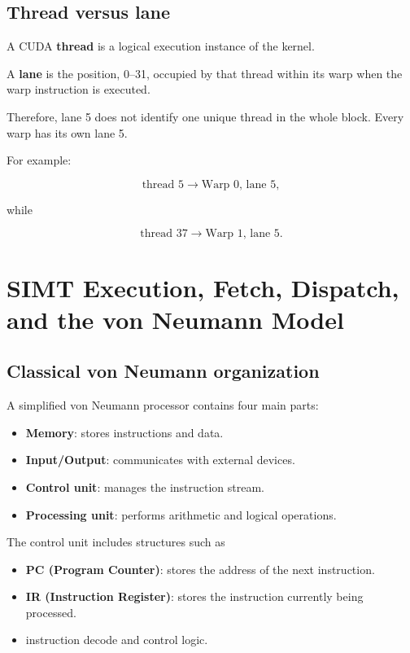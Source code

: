 \documentclass[11pt,a4paper]{article}
\begin{document}
\subsection{Thread versus lane}

A CUDA \textbf{thread} is a logical execution instance of the kernel.

A \textbf{lane} is the position, 0--31, occupied by that thread within its warp when the warp instruction is executed.

Therefore, lane 5 does not identify one unique thread in the whole block. Every warp has its own lane 5.

For example:

\[
\text{thread 5}
\rightarrow
\text{Warp 0, lane 5},
\]

while

\[
\text{thread 37}
\rightarrow
\text{Warp 1, lane 5}.
\]

\section{SIMT Execution, Fetch, Dispatch, and the von Neumann Model}

\subsection{Classical von Neumann organization}

A simplified von Neumann processor contains four main parts:

\begin{itemize}
    \item \textbf{Memory}: stores instructions and data.
    \item \textbf{Input/Output}: communicates with external devices.
    \item \textbf{Control unit}: manages the instruction stream.
    \item \textbf{Processing unit}: performs arithmetic and logical operations.
\end{itemize}

The control unit includes structures such as

\begin{itemize}
    \item \textbf{PC (Program Counter)}: stores the address of the next instruction.
    \item \textbf{IR (Instruction Register)}: stores the instruction currently being processed.
    \item instruction decode and control logic.
\end{itemize}
\end{document}
